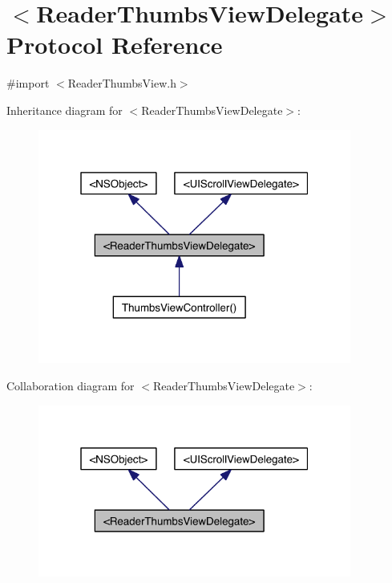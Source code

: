 \hypertarget{protocol_reader_thumbs_view_delegate-p}{\section{$<$Reader\-Thumbs\-View\-Delegate$>$ Protocol Reference}
\label{d9/d3a/protocol_reader_thumbs_view_delegate-p}
}


{\ttfamily \#import $<$Reader\-Thumbs\-View.\-h$>$}



Inheritance diagram for $<$Reader\-Thumbs\-View\-Delegate$>$\-:
\nopagebreak
\begin{figure}[H]
\begin{center}
\leavevmode
\includegraphics[width=292pt]{db/d9e/protocol_reader_thumbs_view_delegate-p__inherit__graph}
\end{center}
\end{figure}


Collaboration diagram for $<$Reader\-Thumbs\-View\-Delegate$>$\-:
\nopagebreak
\begin{figure}[H]
\begin{center}
\leavevmode
\includegraphics[width=292pt]{d4/d70/protocol_reader_thumbs_view_delegate-p__coll__graph}
\end{center}
\end{figure}
